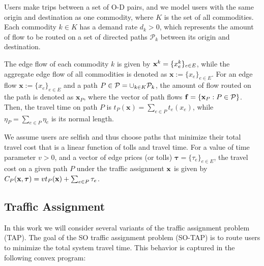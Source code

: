 \documentclass{article}
\newif\ifarxiv   %
\begin{document}
Users make trips between a set of O-D pairs, and we model users with the same origin and destination as one commodity, where $K$ is the set of all commodities. Each commodity $k \in K$ has a demand rate $d_k>0$, which represents the amount of flow to be routed on a set of directed paths $\mathcal{P}_k$ between its origin and destination. 
\ifarxiv 
Here $\mathcal{P}_k$ is the set of all possible paths between the origin and destination corresponding to commodity $k$. 
\fi 
The edge flow of each commodity $k$ is given by $\x^k = \{x_e^k\}_{e\in E}$, while the aggregate edge flow of all commodities is denoted as $\mathbf{x}:=\{x_e\}_{e\in E}$. For an edge flow $\mathbf{x}:=\{x_e\}_{e\in E}$ and a path $P \in \P = \cup_{k \in K} \mathcal{P}_k$, the amount of flow routed on the path is denoted as $\mathbf{x}_P$, where the vector of path flows $\f = \{\mathbf{x}_P: P \in \P \}$. Then, the travel time on path $P$ is $t_P(\mathbf{x}) = \sum_{e \in P} t_e(x_e)$, while $\eta_P = \sum_{e \in P} \eta_e$ is its normal length. 




We assume users are selfish and thus choose paths that minimize their total travel cost that is a linear function of tolls and travel time. For a value of time parameter $v>0$, and a vector of edge prices (or tolls) $\boldsymbol{\tau} = \{\tau_e\}_{e \in E}$, the travel cost on a given path $P$ under the traffic assignment $\x$ is given by $C_{P}(\x, \boldsymbol{\tau}) = v t_P(\mathbf{x}) + \sum_{e \in P} \tau_e$.

\subsection{Traffic Assignment}
In this work we will consider several variants of the traffic assignment problem (TAP). The goal of the SO traffic assignment problem (SO-TAP) is to route users to minimize the total system travel time. This behavior is captured in the following convex program:
\end{document}
